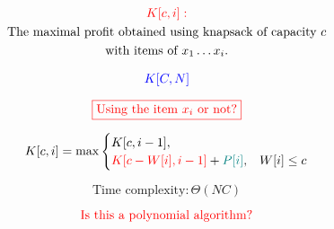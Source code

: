 \begin{frame}{}
  \begin{gather*}
    \textcolor{red}{K[c, i]:} \\
    \text{The maximal profit obtained using knapsack of capacity $c$} \\
    \text{with items of $x_1 \ldots x_i$.}
  \end{gather*}

  \pause
  \vspace{-0.30cm}
  \[
    \textcolor{blue}{K[C, N]}
  \]

  \pause
  \[
    \textcolor{red}{\boxed{$\text{Using the item $x_i$ or not?}$}}
  \]

  \pause
  \[
    K[c, i] = \max \begin{cases}
      K[c, i-1], & \\
      \textcolor{red}{K[c - W[i], i-1]} + \textcolor{teal}{P[i]}, & W[i] \le c \\
    \end{cases}
  \]

  \pause
  \vspace{0.30cm}
  \[
    \text{Time complexity}: \Theta(NC)
  \]

  \pause
  \vspace{-0.30cm}
  \[
    \textcolor{red}{\text{Is this a polynomial algorithm}?}
  \]
\end{frame}

\begin{frame}{}
\end{frame}

% 
% 
% 

